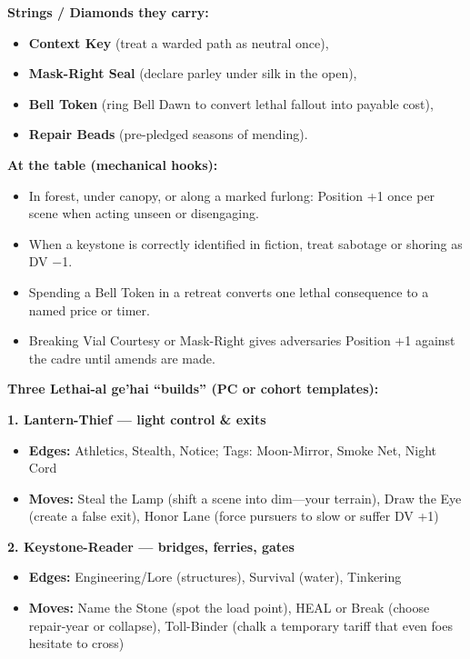 \documentclass[11pt]{article}
\begin{document}
  \textbf{Strings / Diamonds they carry:}
  \begin{itemize}
  \item \textbf{Context Key} (treat a warded path as neutral once),
  \item \textbf{Mask-Right Seal} (declare parley under silk in the open),
  \item \textbf{Bell Token} (ring Bell Dawn to convert lethal fallout into payable cost),
  \item \textbf{Repair Beads} (pre-pledged seasons of mending).
  \end{itemize}
  
  \textbf{At the table (mechanical hooks):}
  \begin{itemize}
  \item In forest, under canopy, or along a marked furlong: Position +1 once per scene when acting unseen or disengaging.
  \item When a keystone is correctly identified in fiction, treat sabotage or shoring as DV −1.
  \item Spending a Bell Token in a retreat converts one lethal consequence to a named price or timer.
  \item Breaking Vial Courtesy or Mask-Right gives adversaries Position +1 against the cadre until amends are made.
  \end{itemize}
  
  \textbf{Three Lethai-al ge'hai ``builds'' (PC or cohort templates):}
  
  \textbf{1. Lantern-Thief --- light control \& exits}
  \begin{itemize}
  \item \textbf{Edges:} Athletics, Stealth, Notice; Tags: Moon-Mirror, Smoke Net, Night Cord
  \item \textbf{Moves:} Steal the Lamp (shift a scene into dim---your terrain), Draw the Eye (create a false exit), Honor Lane (force pursuers to slow or suffer DV +1)
  \end{itemize}
  
  \textbf{2. Keystone-Reader --- bridges, ferries, gates}
  \begin{itemize}
  \item \textbf{Edges:} Engineering/Lore (structures), Survival (water), Tinkering
  \item \textbf{Moves:} Name the Stone (spot the load point), HEAL or Break (choose repair-year or collapse), Toll-Binder (chalk a temporary tariff that even foes hesitate to cross)
  \end{itemize}
  
\end{document}
